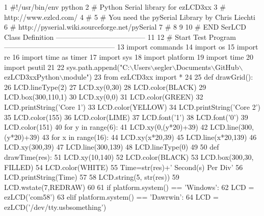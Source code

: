 \begin{DoxyCodeInclude}
1 \textcolor{comment}{#!/usr/bin/env python}
2 \textcolor{comment}{# Python Serial library for ezLCD3xx}
3 \textcolor{comment}{# http://www.ezlcd.com/}
4 \textcolor{comment}{#}
5 \textcolor{comment}{# You need the pySerial Library by Chris Liechti}
6 \textcolor{comment}{# http://pyserial.wiki.sourceforge.net/pySerial}
7 \textcolor{comment}{#}
8 
9 
10 \textcolor{comment}{# END SerLCD Class Definition --------------------------------------}
11 
12 \textcolor{comment}{# Start Test Program -----------------------------------------------}
13 \textcolor{keyword}{import} commands
14 \textcolor{keyword}{import} os
15 \textcolor{keyword}{import} re
16 \textcolor{keyword}{import} time \textcolor{keyword}{as} timer
17 \textcolor{keyword}{import} sys
18 \textcolor{keyword}{import} platform
19 \textcolor{keyword}{import} time
20 \textcolor{keyword}{import} psutil
21     
22 sys.path.append(\textcolor{stringliteral}{"C:\(\backslash\)Users\(\backslash\)segler\(\backslash\)Documents\(\backslash\)GitHub\(\backslash\)ezLCD3xxPython\(\backslash\)module"}) 
23 \textcolor{keyword}{from} ezLCD3xx \textcolor{keyword}{import} *
24 
25 \textcolor{keyword}{def }drawGrid():
26     LCD.lineType(2)
27     LCD.xy(0,30)
28     LCD.color(BLACK)
29     LCD.box(300,110,1)
30     LCD.xy(0,0)
31     LCD.color(GREEN)
32     LCD.printString(\textcolor{stringliteral}{'Core 1'})
33     LCD.color(YELLOW)
34     LCD.printString(\textcolor{stringliteral}{'Core 2'})
35     LCD.color(155)
36     LCD.color(LIME)
37     LCD.font(\textcolor{stringliteral}{'1'})
38     LCD.font(\textcolor{stringliteral}{'0'})
39     LCD.color(151)
40     \textcolor{keywordflow}{for} y \textcolor{keywordflow}{in} range(6):
41         LCD.xy(0,(y*20)+39)
42         LCD.line(300,(y*20)+39)
43     \textcolor{keywordflow}{for} x \textcolor{keywordflow}{in} range(16):
44         LCD.xy(x*20,39)
45         LCD.line(x*20,139)
46     LCD.xy(300,39)
47     LCD.line(300,139)
48     LCD.lineType(0)
49     
50 \textcolor{keyword}{def }drawTime(res):
51     LCD.xy(10,140)
52     LCD.color(BLACK)
53     LCD.box(300,30, FILLED)
54     LCD.color(WHITE)
55     Time=str(res)+\textcolor{stringliteral}{' Second(s) Per Div'}
56     LCD.printString(Time)
57 
58     LCD.string(5, str(res))
59     LCD.wstate(7,REDRAW)
60             
61 \textcolor{keywordflow}{if} platform.system() == \textcolor{stringliteral}{'Windows'}:
62     LCD = ezLCD(\textcolor{stringliteral}{'com58'}) 
63 \textcolor{keywordflow}{elif} platform.system() == \textcolor{stringliteral}{'Dawrwin'}:
64     LCD = ezLCD(\textcolor{stringliteral}{'/dev/tty.usbsomething'})

\end{DoxyCodeInclude}
